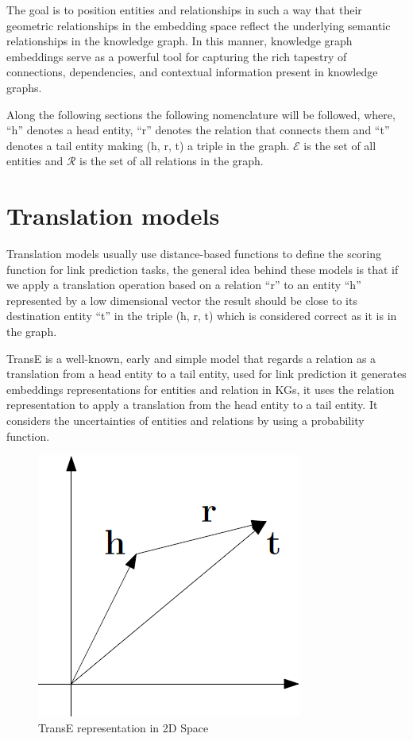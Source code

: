The goal is to position entities and relationships in such a way that their geometric relationships in the embedding space reflect the underlying semantic relationships in the knowledge graph. In this manner, knowledge graph embeddings serve as a powerful tool for capturing the rich tapestry of connections, dependencies, and contextual information present in knowledge graphs.

Along the following sections  the following nomenclature will be followed, where, ``h'' denotes a head entity, ``r'' denotes the relation that connects them and ``t'' denotes a tail entity making (h, r, t) a triple in the graph. $\mathcal{E}$ is the set of all entities and $\mathcal{R}$ is the set of all relations in the graph.

\section{Translation models}\label{sec:emb-translations}


Translation models usually use distance-based functions to define the scoring function for link prediction tasks, the general idea behind these models is that if we apply a translation operation based on a relation ``r'' to an entity ``h'' represented by a low dimensional vector the result should be close to its destination entity ``t'' in the triple (h, r, t) which is considered correct as it is in the graph.

TransE \cite{} is a well-known, early and simple model that regards a relation as a translation from a head entity to a tail entity, used for link prediction it generates embeddings representations for entities and relation in KGs, it uses the relation representation to apply a translation from the head entity to a tail entity. It considers the uncertainties of entities and relations by using a probability function. 

\begin{figure}[!htp]
    \centering
    \includegraphics[width=.4\textwidth]{fig/embeddings/TransE.png}
    \caption{TransE representation in 2D Space}
    \label{fig:emb-transE}
\end{figure}

